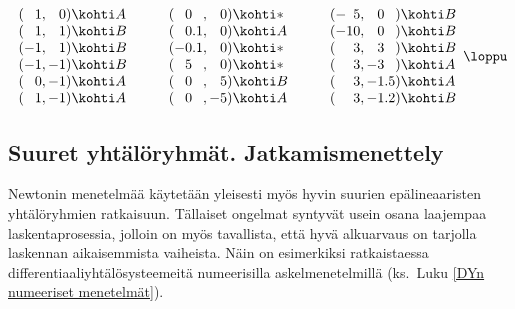 \[
\begin{array}{lll}
(\phantom{-}1,\phantom{-}0)\kohti A\qquad & 
(\phantom{-}0\phantom{.0},\phantom{-}0)\kohti * \qquad & 
(-\phantom{1}5,\phantom{-}0\phantom{.0})\kohti B \\ 
(\phantom{-}1,\phantom{-}1)\kohti B\qquad & 
(\phantom{-}0.1,\phantom{-}0)\kohti A \qquad & 
(-10,\phantom{-}0\phantom{.0})\kohti B \\
(-1,\phantom{-}1)\kohti B\qquad & 
(-0.1,\phantom{-}0)\kohti * \qquad & 
(\phantom{-1}3,\phantom{-}3\phantom{.0})\kohti B \\
(-1,-1)\kohti B\qquad & 
(\phantom{-}5\phantom{.0},\phantom{-}0)\kohti * \qquad & 
(\phantom{-1}3,-3\phantom{.0})\kohti A \\
(\phantom{-}0,-1)\kohti A\qquad & 
(\phantom{-}0\phantom{.0},\phantom{-}5)\kohti B \qquad & 
(\phantom{-1}3,-1.5)\kohti A \\
(\phantom{-}1,-1)\kohti A\qquad & 
(\phantom{-}0\phantom{.0},-5)\kohti A \qquad & 
(\phantom{-1}3,-1.2)\kohti B \\
\end{array} \loppu
\]

\subsection{Suuret yhtälöryhmät. Jatkamismenettely}

Newtonin menetelmää käytetään yleisesti myös hyvin suurien epälineaaristen yhtälöryhmien
ratkaisuun. Tällaiset ongelmat syntyvät usein osana laajempaa laskentaprosessia, jolloin
on myös tavallista, että hyvä alkuarvaus on tarjolla laskennan aikaisemmista vaiheista.
Näin on  esimerkiksi ratkaistaessa differentiaaliyhtälösysteemeitä numeerisilla
askelmenetelmillä (ks.\ Luku \ref{DYn numeeriset menetelmät}). 

